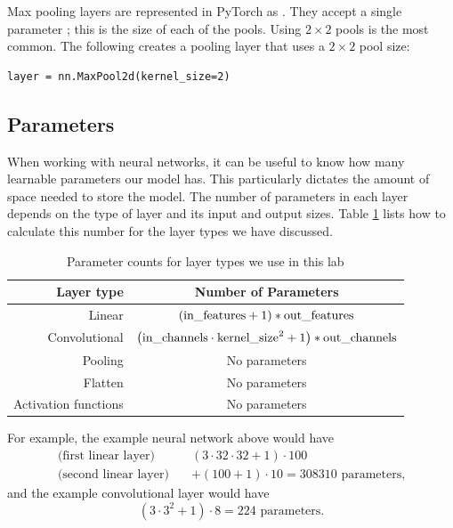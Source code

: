 Max pooling layers are represented in PyTorch as .
They accept a single parameter ; this is the size of each of the pools.
Using \(2\times2\) pools is the most common.
The following creates a pooling layer that uses a \(2\times 2\) pool size:
\begin{lstlisting}
layer = nn.MaxPool2d(kernel_size=2)
\end{lstlisting}

\subsection*{Parameters}

When working with neural networks, it can be useful to know how many learnable parameters our model has.
This particularly dictates the amount of space needed to store the model.
The number of parameters in each layer depends on the type of layer and its input and output sizes.
Table \ref{table:param_cts} lists how to calculate this number for the layer types we have discussed.

\begin{table}
	\centering
	\begin{tabular}{r|c}
	Layer type & Number of Parameters \\
	\hline
	Linear & \((\lieq{in_features}+1)*\lieq{out_features}\) \\
	Convolutional & \(\left(\lieq{in_channels}\cdot \lieq{kernel_size}^2 + 1\right)*\lieq{out_channels}\) \\
	Pooling & No parameters \\
	Flatten & No parameters \\
	Activation functions & No parameters \\
	\end{tabular}
	\caption{Parameter counts for layer types we use in this lab}
	\label{table:param_cts}
\end{table}

For example, the example neural network above would have
\begin{align*}
\text{(first linear layer)}\quad\quad&
(3\cdot32\cdot 32+1)\cdot100 
\\
\text{(second linear layer)}\quad&
+(100+1)\cdot10 = 308310 \text{ parameters,}
\end{align*}
and the example convolutional layer would have
\[
(3\cdot 3^2+1)\cdot 8 = 224 \text{ parameters.}
\]

